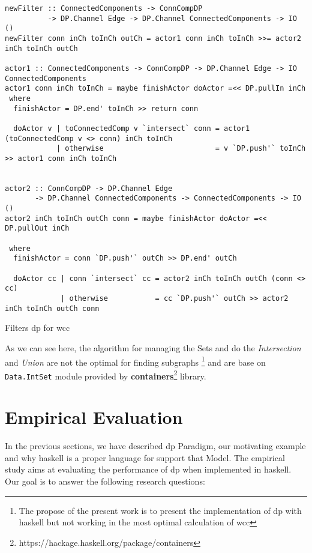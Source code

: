 \documentclass[preprint]{elsarticle}
\begin{document}
\begin{listing}[H]
\begin{verbatim}
newFilter :: ConnectedComponents -> ConnCompDP 
          -> DP.Channel Edge -> DP.Channel ConnectedComponents -> IO ()
newFilter conn inCh toInCh outCh = actor1 conn inCh toInCh >>= actor2 inCh toInCh outCh

actor1 :: ConnectedComponents -> ConnCompDP -> DP.Channel Edge -> IO ConnectedComponents
actor1 conn inCh toInCh = maybe finishActor doActor =<< DP.pullIn inCh
 where
  finishActor = DP.end' toInCh >> return conn

  doActor v | toConnectedComp v `intersect` conn = actor1 (toConnectedComp v <> conn) inCh toInCh
            | otherwise                          = v `DP.push'` toInCh >> actor1 conn inCh toInCh


actor2 :: ConnCompDP -> DP.Channel Edge 
       -> DP.Channel ConnectedComponents -> ConnectedComponents -> IO ()
actor2 inCh toInCh outCh conn = maybe finishActor doActor =<< DP.pullOut inCh

 where
  finishActor = conn `DP.push'` outCh >> DP.end' outCh

  doActor cc | conn `intersect` cc = actor2 inCh toInCh outCh (conn <> cc)
             | otherwise           = cc `DP.push'` outCh >> actor2 inCh toInCh outCh conn
\end{verbatim}
\caption{Filters \acrshort{dp} for \acrshort{wcc}}
\label{src:haskell:3}
\end{listing}

As we can see here, the algorithm for managing the Sets and do the \textit{Intersection} and \textit{Union} are not the  optimal for finding subgraphs\label{not:optimal}
\footnote{The propose of the present work is to present the implementation of \acrshort{dp} with \acrshort{haskell} but not working in the most optimal calculation of \acrshort{wcc}} and are base
on \texttt{Data.IntSet} module provided by \textbf{containers}\footnote{https://hackage.haskell.org/package/containers} library.

\section{Empirical Evaluation}
In the previous sections, we have described \acrshort{dp} Paradigm, our motivating example and why \acrshort{haskell} is a proper language for support that Model.
The empirical study aims at evaluating the performance of \acrshort{dp} when implemented in \acrshort{haskell}. 
Our goal is to answer the following research questions: 
\end{document}
